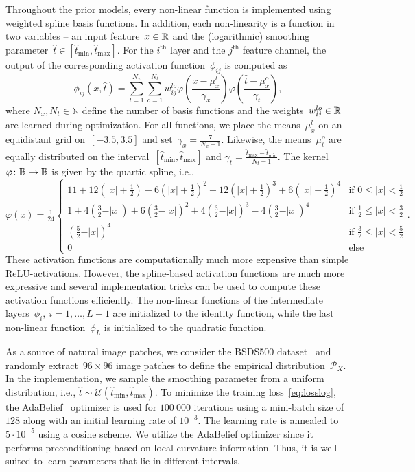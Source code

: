 \documentclass[nohyperref]{article}
\newcommand{\N}{\mathbb{N}}
\def\hatt{{\widehat{t}}}
\newcommand{\tminh}{\hatt_\mathrm{min}}
\newcommand{\tmaxh}{\hatt_\mathrm{max}}
\newcommand{\dist}[1]{\mathcal{P}_{#1}}
\theoremstyle{plain}
\theoremstyle{definition}
\theoremstyle{remark}
\begin{document}
Throughout the prior models, every non-linear function is implemented using weighted spline basis functions.
In addition, each non-linearity is a function in two variables -- an input feature~$x\in\mathbb{R}$ and the (logarithmic) smoothing parameter~$\widehat{t}\in[\tminh,\tmaxh]$.
For the $i^\text{th}$ layer and the $j^\text{th}$ feature channel, the output of the corresponding activation function~$\phi_{ij}$ is computed as
\[
\phi_{ij}(x,\widehat{t}) = \sum_{l=1}^{N_x}\sum_{o=1}^{N_t} w_{ij}^{lo} \varphi\left(\frac{x-\mu_x^l}{\gamma_x}\right) \varphi\left(\frac{\widehat{t}-\mu_x^o}{\gamma_t}\right),
\]
where $N_x,N_t\in\N$ define the number of basis functions and the weights~$w_{ij}^{lo}\in\mathbb{R}$ are learned during optimization.
For all functions, we place the means~$\mu_x^l$ on an equidistant grid on~$[-3.5,3.5]$ and set~$\gamma_x=\frac{7}{N_x-1}$.
Likewise, the means~$\mu_t^o$ are equally distributed on the interval~$[\tminh,\tmaxh]$ and $\gamma_t=\frac{\tmaxh-\tminh}{N_t-1}$.
The kernel~$\varphi\colon\mathbb{R}\to\mathbb{R}$ is given by the quartic spline, i.e.,
\[
\varphi(x)=\tfrac{1}{24}
\begin{cases}
11 + 12(\vert x\vert+\frac12) - 6(\vert x\vert+\frac12)^2 - 12(\vert x\vert+\frac12)^3 + 6(\vert x\vert+\frac12)^4 &\text{if } 0\leq\vert x\vert< \frac12\\
1 + 4(\frac32-\vert x\vert) + 6(\frac32-\vert x\vert)^2 + 4(\frac32-\vert x\vert)^3 - 4(\frac32-\vert x\vert)^4 &\text{if } \frac12\leq \vert x\vert< \frac32\\
(\frac52-\vert x\vert)^4 &\text{if } \frac32\leq \vert x\vert<\frac52\\
0 &\text{else}
\end{cases}.
\]
These activation functions are computationally much more expensive than simple ReLU-activations.
However, the spline-based activation functions are much more expressive and several implementation tricks can be used to compute these activation functions efficiently.
The non-linear functions of the intermediate layers~$\phi_i,\ i=1,\ldots,L-1$ are initialized to the identity function, while the last non-linear function~$\phi_L$ is initialized to the quadratic function.

As a source of natural image patches, we consider the BSDS500 dataset~\cite{MaFo01} and randomly extract~$96\times 96$ image patches to define the empirical distribution~$\dist{X}$.
In the implementation, we sample the smoothing parameter from a uniform distribution, i.e., $\widehat{t}\sim\mathcal{U}(\tminh,\tmaxh)$.
To minimize the training loss~\eqref{eq:losslog}, the AdaBelief~\citep{ZhTa20} optimizer is used for $100\ 000$ iterations using a mini-batch size of~$128$ along with an initial learning rate of $10^{-3}$.
The learning rate is annealed to~$5\cdot 10^{-5}$ using a cosine scheme.
We utilize the AdaBelief optimizer since it performs preconditioning based on local curvature information.
Thus, it is well suited to learn parameters that lie in different intervals.
\end{document}
